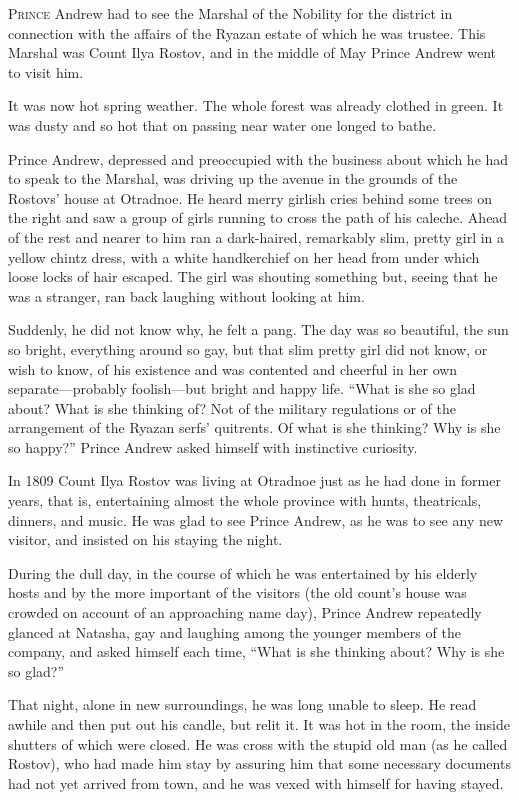 \lettrine[lines=2, loversize=0.3, lraise=0]{\initfamily P}{rince}
Andrew had to see the Marshal of the Nobility for the
district in connection with the affairs of the Ryazan estate of
which he was trustee. This Marshal was Count Ilya Rostov, and in
the middle of May Prince Andrew went to visit him.

It was now hot spring weather. The whole forest was already
clothed in green. It was dusty and so hot that on passing near
water one longed to bathe.

Prince Andrew, depressed and preoccupied with the business about
which he had to speak to the Marshal, was driving up the avenue
in the grounds of the Rostovs' house at Otradnoe. He heard merry
girlish cries behind some trees on the right and saw a group of
girls running to cross the path of his caleche. Ahead of the rest
and nearer to him ran a dark-haired, remarkably slim, pretty girl
in a yellow chintz dress, with a white handkerchief on her head
from under which loose locks of hair escaped. The girl was
shouting something but, seeing that he was a stranger, ran back
laughing without looking at him.

Suddenly, he did not know why, he felt a pang. The day was so
beautiful, the sun so bright, everything around so gay, but that
slim pretty girl did not know, or wish to know, of his existence
and was contented and cheerful in her own separate---probably
foolish---but bright and happy life. ``What is she so glad about?
What is she thinking of? Not of the military regulations or of
the arrangement of the Ryazan serfs' quitrents. Of what is she
thinking? Why is she so happy?'' Prince Andrew asked himself with
instinctive curiosity.

In 1809 Count Ilya Rostov was living at Otradnoe just as he had
done in former years, that is, entertaining almost the whole
province with hunts, theatricals, dinners, and music. He was glad
to see Prince Andrew, as he was to see any new visitor, and
insisted on his staying the night.

During the dull day, in the course of which he was entertained by
his elderly hosts and by the more important of the visitors (the
old count's house was crowded on account of an approaching name
day), Prince Andrew repeatedly glanced at Natasha, gay and
laughing among the younger members of the company, and asked
himself each time, ``What is she thinking about? Why is she so
glad?''

That night, alone in new surroundings, he was long unable to
sleep. He read awhile and then put out his candle, but relit
it. It was hot in the room, the inside shutters of which were
closed. He was cross with the stupid old man (as he called
Rostov), who had made him stay by assuring him that some
necessary documents had not yet arrived from town, and he was
vexed with himself for having stayed.

